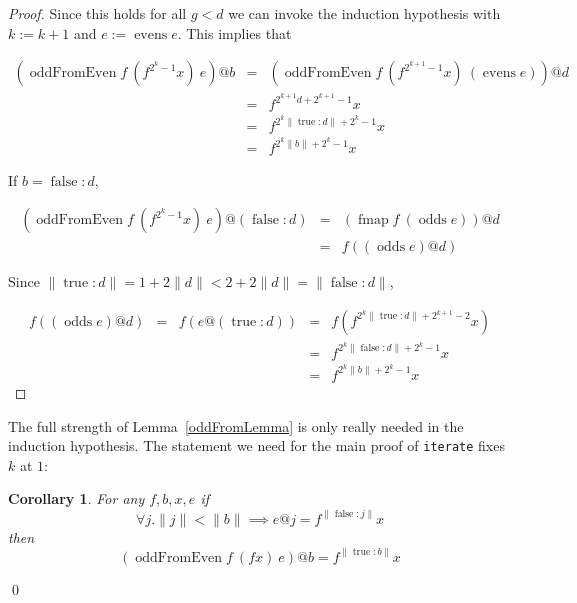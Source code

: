 \documentclass{llncs}
\DeclareMathOperator{\oddFrom}{oddFromEven}
\DeclareMathOperator{\true}{true}
\DeclareMathOperator{\false}{false}
\DeclareMathOperator{\evens}{evens}
\DeclareMathOperator{\odds}{odds}
\DeclareMathOperator{\fmap}{fmap}
\newcommand{\ord}[1]{\|#1\|}
\newcommand{\cons}[2]{#1:#2}
\newtheorem{corollary}[theorem]{Corollary}
\begin{document}
\begin{proof}
Since this holds for all $g < d$ we can invoke the induction hypothesis with $k := k+1$ and $e := \evens e$.
This implies that

\begin{displaymath}
\begin{array}{rcl}
(\oddFrom f\ (f^{2^k-1}x)\ e)@b & = & (\oddFrom f\ (f^{2^{k+1}-1}x)\ (\evens e))@d \\
& = & f^{2^{k+1}d+2^{k+1}-1} x \\
& = & f^{2^k\ord{\cons{\true}{d}}+2^k-1} x \\
& = & f^{2^k\ord{b}+2^k-1} x
\end{array}
\end{displaymath}

If $b = \cons{\false}{d}$,

\begin{displaymath}
\begin{array}{rcl}
(\oddFrom f\ (f^{2^k-1}x)\ e)@(\cons{\false}{d})& = & (\fmap f\ (\odds e))@d \\
& = & f ((\odds e)@d)
\end{array}
\end{displaymath}

Since
$\ord{\cons{\true}{d}} = 1+2\ord{d} < 2+2\ord{d} = \ord{\cons{\false}{d}}$,

\begin{displaymath}
\begin{array}{rcccl}
f((\odds e)@d) & = & f(e@(\cons{\true}{d})) & = & f(f^{2^k\ord{\cons{\true}{d}}+2^{k+1}-2}x) \\
& & & = & f^{2^k\ord{\cons{\false}{d}}+2^k-1}x \\
& & & = & f^{2^k\ord{b}+2^k-1}x
\end{array}
\end{displaymath}

\end{proof}

The full strength of Lemma~\ref{oddFromLemma} is only really needed in the induction hypothesis.
The statement we need for the main proof of \verb|iterate| fixes $k$ at $1$:

\begin{corollary}\label{oddFromCorollary}
For any $f, b, x, e$
if
\begin{displaymath}
\forall j . \ord{j} < \ord{b} \implies e@j = f^{\ord{\cons{\false}{j}}}x
\end{displaymath}
then
\begin{displaymath}
(\oddFrom f\ (f x)\ e)@b = f^{\ord{\cons{\true}{b}}}x
\end{displaymath}
\end{corollary}
\qed
\end{document}
